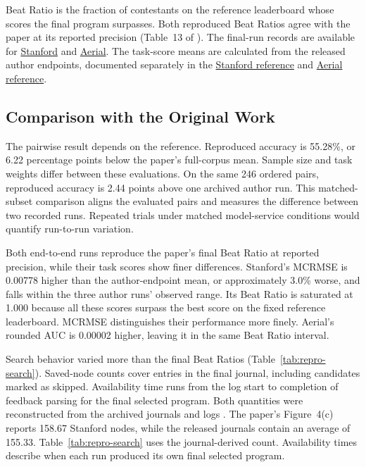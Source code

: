 Beat Ratio is the fraction of contestants on the reference leaderboard whose scores the final program surpasses. Both reproduced Beat Ratios agree with the paper at its reported precision (Table~13 of \citet{zheng2026predict}). The final-run records are available for \href{https://github.com/skyexry/foreagent-reproduction/blob/a80ae9cb0ea15a6f2c3d5666528a01a3006009c5/experiments/online-stanford-v2/final-summary.json}{Stanford} and \href{https://github.com/skyexry/foreagent-reproduction/blob/a80ae9cb0ea15a6f2c3d5666528a01a3006009c5/experiments/online-cactus-v1/final-summary.json}{Aerial}. The task-score means are calculated from the released author endpoints, documented separately in the \href{https://github.com/skyexry/foreagent-reproduction/blob/a80ae9cb0ea15a6f2c3d5666528a01a3006009c5/experiments/online-stanford-v2/author-final-reference.json}{Stanford reference} and \href{https://github.com/skyexry/foreagent-reproduction/blob/a80ae9cb0ea15a6f2c3d5666528a01a3006009c5/experiments/online-cactus-v1/evidence/cactus-author-comparison-reference.json}{Aerial reference}.

\subsection{Comparison with the Original Work}
The pairwise result depends on the reference. Reproduced accuracy is 55.28\%, or 6.22 percentage points below the paper's full-corpus mean. Sample size and task weights differ between these evaluations. On the same 246 ordered pairs, reproduced accuracy is 2.44 points above one archived author run. This matched-subset comparison aligns the evaluated pairs and measures the difference between two recorded runs. Repeated trials under matched model-service conditions would quantify run-to-run variation.

Both end-to-end runs reproduce the paper's final Beat Ratio at reported precision, while their task scores show finer differences. Stanford's MCRMSE is 0.00778 higher than the author-endpoint mean, or approximately 3.0\% worse, and falls within the three author runs' observed range. Its Beat Ratio is saturated at 1.000 because all these scores surpass the best score on the fixed reference leaderboard. MCRMSE distinguishes their performance more finely. Aerial's rounded AUC is 0.00002 higher, leaving it in the same Beat Ratio interval.

Search behavior varied more than the final Beat Ratios (Table~\ref{tab:repro-search}). Saved-node counts cover entries in the final journal, including candidates marked as skipped. Availability time runs from the log start to completion of feedback parsing for the final selected program. Both quantities were reconstructed from the archived journals and logs \citep{foreagentdata}. The paper's Figure~4(c) reports 158.67 Stanford nodes, while the released journals contain an average of 155.33. Table~\ref{tab:repro-search} uses the journal-derived count. Availability times describe when each run produced its own final selected program.

